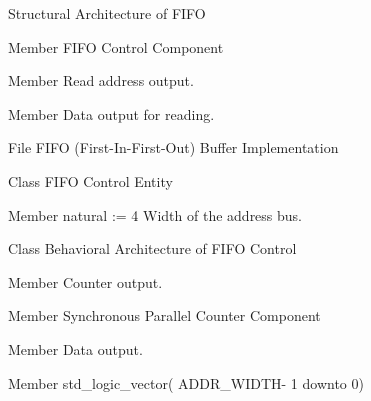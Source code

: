 \begin{DoxyRefList}
%
 Structural Architecture of FIFO 
\item[Member \doxylink{classfifo_1_1structural_a836a588bee2503d0b00431df0b751bb4}{fifo.structural.fifo\+\_\+ctrl} ]\label{brief__brief000027}%
%
 FIFO Control Component 
\item[Member \doxylink{classfifo_1_1structural_ad2c653f0e637ddfbcf83b2efe8e40556}{fifo.structural.reg\+\_\+file} ]\label{brief__brief000028}%
%
 Read address output.  
\item[Member \doxylink{classfifo_1_1structural_ae014d091fdea9b7180c03636469e2e11}{fifo.structural.w\+\_\+addr} ]\label{brief__brief000029}%
%
 Data output for reading.  
\item[File \doxylink{fifo_8vhdl}{fifo.vhdl} ]\label{brief__brief000022}%
%
 FIFO (First-\/\+In-\/\+First-\/\+Out) Buffer Implementation 
\item[Class \doxylink{classfifo__ctrl}{fifo\+\_\+ctrl} ]\label{brief__brief000031}%
%
 FIFO Control Entity 
\item[Member \doxylink{classfifo__ctrl_a97ed8c4ac7d6de2665dc3b2d8ab90ea3}{fifo\+\_\+ctrl.ADDR\+\_\+\+WIDTH} natural \+:= 4]\label{brief__brief000032}%
%
 Width of the address bus.  
\item[Class \doxylink{classfifo__ctrl_1_1behavioral}{fifo\+\_\+ctrl.behavioral} ]\label{brief__brief000034}%
%
 Behavioral Architecture of FIFO Control 
\item[Member \doxylink{classfifo__ctrl_1_1behavioral_abb1f4b1077fed42215491ace6164cf2c}{fifo\+\_\+ctrl.behavioral.register\+\_\+d} ]\label{brief__brief000036}%
%
 Counter output.  
\item[Member \doxylink{classfifo__ctrl_1_1behavioral_a91db294fcb9fcb66fc8d9ca0f821c4a6}{fifo\+\_\+ctrl.behavioral.sync\+\_\+par\+\_\+counter} ]\label{brief__brief000035}%
%
 Synchronous Parallel Counter Component 
\item[Member \doxylink{classfifo__ctrl_1_1behavioral_a83591d3b1f60415f3d298e96d62fc453}{fifo\+\_\+ctrl.behavioral.w\+\_\+ptr\+\_\+logic\+\_\+reset} ]\label{brief__brief000037}%
%
 Data output.  
\item[Member \doxylink{classfifo__ctrl_ad1f8c802bb96762f4248ed7ec1013525}{fifo\+\_\+ctrl.r\+\_\+addr} std\+\_\+logic\+\_\+vector( ADDR\+\_\+\+WIDTH-\/ 1 downto 0) ]\label{brief__brief000033}%

\end{DoxyRefList}
